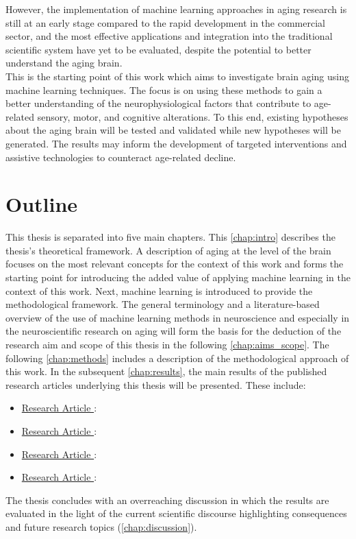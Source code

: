 However, the implementation of machine learning approaches in aging research is still at an early stage compared to the rapid development in the commercial sector, and the most effective applications and integration into the traditional scientific system have yet to be evaluated, despite the potential to better understand the aging brain.\\
This is the starting point of this work which aims to investigate brain aging using machine learning techniques. The focus is on using these methods to gain a better understanding of the neurophysiological factors that contribute to age-related sensory, motor, and cognitive alterations. To this end, existing hypotheses about the aging brain will be tested and validated while new hypotheses will be generated. The results may inform the development of targeted interventions and assistive technologies to counteract age-related decline.

\section{Outline}
This thesis is separated into five main chapters. This \autoref{chap:intro} describes the thesis's theoretical framework. A description of aging at the level of the brain focuses on the most relevant concepts for the context of this work and forms the starting point for introducing the added value of applying machine learning in the context of this work. Next, machine learning is introduced to provide the methodological framework. The general terminology and a literature-based overview of the use of machine learning methods in neuroscience and especially in the neuroscientific research on aging will form the basis for the deduction of the research aim and scope of this thesis in the following \autoref{chap:aims_scope}. The following \autoref{chap:methods} includes a description of the methodological approach of this work. In the subsequent \autoref{chap:results}, the main results of the published research articles underlying this thesis will be presented. These include:

\begin{itemize}
\item \hyperref[paperI]{Research Article }:\\ 
\item \hyperref[paperII]{Research Article }:\\ 
\item \hyperref[paperIII]{Research Article }:\\ 
\item \hyperref[paperIV]{Research Article }:\\ 
\end{itemize}
\noindent The thesis concludes with an overreaching discussion in which the results are evaluated in the light of the current scientific discourse highlighting consequences and future research topics (\autoref{chap:discussion}). 
